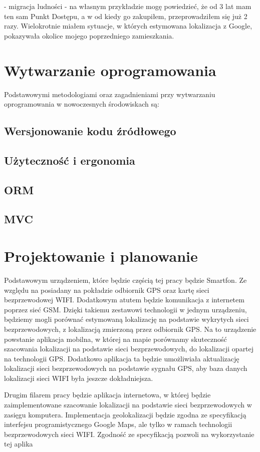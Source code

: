 - migracja ludności - na własnym przykładzie mogę powiedzieć, że od 3 lat mam ten sam Punkt Dostępu, a w od kiedy go zakupiłem, przeprowadziłem się już 2 razy. Wielokrotnie miałem sytuacje, w których estymowana lokalizacja z Google, pokazywała okolice mojego poprzedniego zamieszkania.

\section{Wytwarzanie oprogramowania}
Podstawowymi metodologiami oraz zagadnieniami przy wytwarzaniu oprogramowania w nowoczesnych środowiskach są:

\subsection{Wersjonowanie kodu źródłowego}
\subsection{Użyteczność i ergonomia}
\subsection{ORM}
\subsection{MVC}


\section{Projektowanie i planowanie}
Podstawowym urządzeniem, które będzie częścią tej pracy będzie Smartfon. Ze względu na posiadany na pokładzie odbiornik GPS oraz kartę sieci bezprzewodowej WIFI. Dodatkowym atutem będzie komunikacja z internetem poprzez sieć GSM. Dzięki takiemu zestawowi technologii w jednym urządzeniu, będziemy mogli porównać estymowaną lokalizację na podstawie wykrytych sieci bezprzewodowych, z lokalizacją zmierzoną przez odbiornik GPS. Na to urządzenie powstanie aplikacja mobilna, w której na mapie porównamy skuteczność szacowania lokalizacji na podstawie sieci bezprzewodowych, do lokalizacji opartej na technologii GPS. Dodatkowo aplikacja ta będzie umożliwiała aktualizację lokalizacji sieci bezprzewodowych na podstawie sygnału GPS, aby baza danych lokalizacji sieci WIFI była jeszcze dokładniejsza.

Drugim filarem pracy będzie aplikacja internetowa, w której będzie zaimplementowane szacowanie lokalizacji na podstawie sieci bezprzewodowych w zasięgu komputera. Implementacja geolokalizacji będzie zgodna ze specyfikacją interfejsu programistycznego Google Maps, ale tylko w ramach technologii bezprzewodowych sieci WIFI. Zgodność ze specyfikacją pozwoli na wykorzystanie tej aplika 


